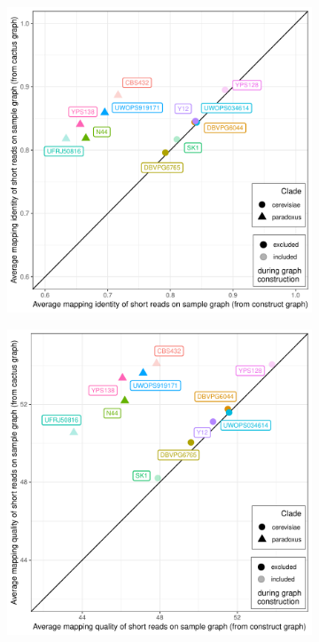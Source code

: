 \documentclass{article}
\begin{document}
\clearpage
\begin{figure}
  \begin{subfigure}[b]{.5\textwidth}
    \caption{}
    \includegraphics[width=\textwidth]{pdf/yeast-genotyping-identity-four.pdf}
  \end{subfigure}
  \begin{subfigure}[b]{.5\textwidth}
    \caption{}
    \includegraphics[width=\textwidth]{pdf/yeast-genotyping-quality-four.pdf}
  \end{subfigure}
\end{figure}
\end{document}
